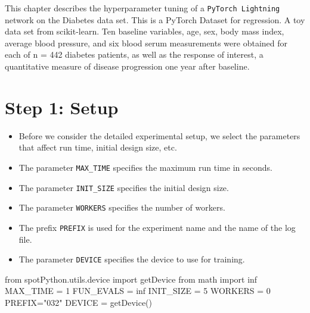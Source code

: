 \documentclass[
  letterpaper,
  DIV=11,
  numbers=noendperiod]{scrreprt}
\newenvironment{Shaded}{\begin{snugshade}}{\end{snugshade}}
\newcommand{\DecValTok}[1]{\textcolor[rgb]{0.68,0.00,0.00}{#1}}
\newcommand{\ImportTok}[1]{\textcolor[rgb]{0.00,0.46,0.62}{#1}}
\newcommand{\NormalTok}[1]{\textcolor[rgb]{0.00,0.23,0.31}{#1}}
\newcommand{\OperatorTok}[1]{\textcolor[rgb]{0.37,0.37,0.37}{#1}}
\newcommand{\StringTok}[1]{\textcolor[rgb]{0.13,0.47,0.30}{#1}}
\providecommand{\tightlist}{%
  \setlength{\itemsep}{0pt}\setlength{\parskip}{0pt}}\usepackage{longtable,booktabs,array}
\begin{document}
This chapter describes the hyperparameter tuning of a
\texttt{PyTorch\ Lightning} network on the Diabetes data set. This is a
PyTorch Dataset for regression. A toy data set from scikit-learn. Ten
baseline variables, age, sex, body mass index, average blood pressure,
and six blood serum measurements were obtained for each of n = 442
diabetes patients, as well as the response of interest, a quantitative
measure of disease progression one year after baseline.

\section{Step 1: Setup}\label{sec-setup-32}

\begin{itemize}
\tightlist
\item
  Before we consider the detailed experimental setup, we select the
  parameters that affect run time, initial design size, etc.
\item
  The parameter \texttt{MAX\_TIME} specifies the maximum run time in
  seconds.
\item
  The parameter \texttt{INIT\_SIZE} specifies the initial design size.
\item
  The parameter \texttt{WORKERS} specifies the number of workers.
\item
  The prefix \texttt{PREFIX} is used for the experiment name and the
  name of the log file.
\item
  The parameter \texttt{DEVICE} specifies the device to use for
  training.
\end{itemize}

\begin{Shaded}
\begin{Highlighting}[]
\ImportTok{from}\NormalTok{ spotPython.utils.device }\ImportTok{import}\NormalTok{ getDevice}
\ImportTok{from}\NormalTok{ math }\ImportTok{import}\NormalTok{ inf}
\NormalTok{MAX\_TIME }\OperatorTok{=} \DecValTok{1}
\NormalTok{FUN\_EVALS }\OperatorTok{=}\NormalTok{ inf}
\NormalTok{INIT\_SIZE }\OperatorTok{=} \DecValTok{5}
\NormalTok{WORKERS }\OperatorTok{=} \DecValTok{0}
\NormalTok{PREFIX}\OperatorTok{=}\StringTok{"032"}
\NormalTok{DEVICE }\OperatorTok{=}\NormalTok{ getDevice()}
\end{Highlighting}
\end{Shaded}
\end{document}
